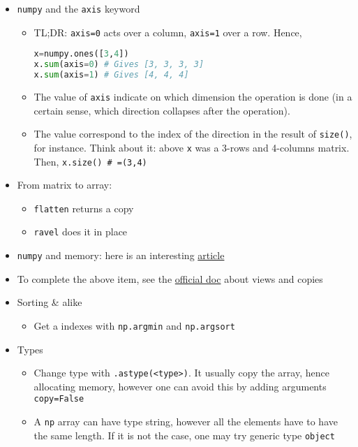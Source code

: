 \documentclass[a4paper,12pt,%
              final%
              ]{article}
\begin{document}
\begin{itemize}
\begin{itemize}
\begin{itemize}
        \end{itemize}
      \item \texttt{numpy} and the \texttt{axis} keyword
        \begin{itemize}
          \item TL;DR: \verb|axis=0| acts over a column, \verb|axis=1| over a row. Hence,
\begin{lstlisting}[language=python]
x=numpy.ones([3,4])
x.sum(axis=0) # Gives [3, 3, 3, 3]
x.sum(axis=1) # Gives [4, 4, 4]
\end{lstlisting}
          \item The value of \texttt{axis} indicate on which dimension the operation is done (in a certain sense, which direction collapses after the operation).
          \item The value correspond to the index of the direction in the result of \verb|size()|, for instance. Think about it: above \verb|x| was a 3-rows and 4-columns matrix. Then, \verb|x.size() # =(3,4)|
        \end{itemize}
      \item From matrix to array:
        \begin{itemize}
          \item \texttt{flatten} returns a copy
          \item \texttt{ravel} does it in place
        \end{itemize}
      \item \texttt{numpy} and memory: here is an interesting \href{https://pythonspeed.com/articles/numpy-memory-views/}{article}
      \item To complete the above item, see the \href{https://numpy.org/doc/stable/user/basics.copies.html}{official doc} about views and copies
      \item Sorting \& alike
        \begin{itemize}
          \item Get a indexes with \verb|np.argmin| and \verb|np.argsort|
        \end{itemize}
      \item Types
        \begin{itemize}
          \item Change type with \verb|.astype(<type>)|. It usually copy the array, hence allocating memory, however one can avoid this by adding arguments \texttt{copy=False}
          \item A \texttt{np} array can have type string, however all the elements have to have the same length. If it is not the case, one may try generic type \texttt{object}

\end{itemize}
\end{itemize}
\end{itemize}
\end{document}
